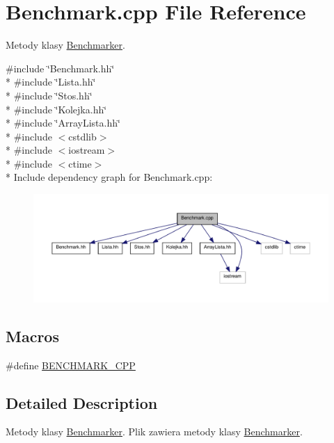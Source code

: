 \hypertarget{a00008}{\section{Benchmark.\-cpp File Reference}
\label{a00008}
}


Metody klasy \hyperlink{a00002}{Benchmarker}.  


{\ttfamily \#include \char`\"{}Benchmark.\-hh\char`\"{}}\\*
{\ttfamily \#include \char`\"{}Lista.\-hh\char`\"{}}\\*
{\ttfamily \#include \char`\"{}Stos.\-hh\char`\"{}}\\*
{\ttfamily \#include \char`\"{}Kolejka.\-hh\char`\"{}}\\*
{\ttfamily \#include \char`\"{}Array\-Lista.\-hh\char`\"{}}\\*
{\ttfamily \#include $<$cstdlib$>$}\\*
{\ttfamily \#include $<$iostream$>$}\\*
{\ttfamily \#include $<$ctime$>$}\\*
Include dependency graph for Benchmark.\-cpp\-:\nopagebreak
\begin{figure}[H]
\begin{center}
\leavevmode
\includegraphics[width=350pt]{a00022}
\end{center}
\end{figure}
\subsection*{Macros}
\begin{DoxyCompactItemize}
\item 
\#define \hyperlink{a00008_af899221e0ac3b868dd9a8298bd9b1f12}{B\-E\-N\-C\-H\-M\-A\-R\-K\-\_\-\-C\-P\-P}
\end{DoxyCompactItemize}


\subsection{Detailed Description}
Metody klasy \hyperlink{a00002}{Benchmarker}. Plik zawiera metody klasy \hyperlink{a00002}{Benchmarker}. 

